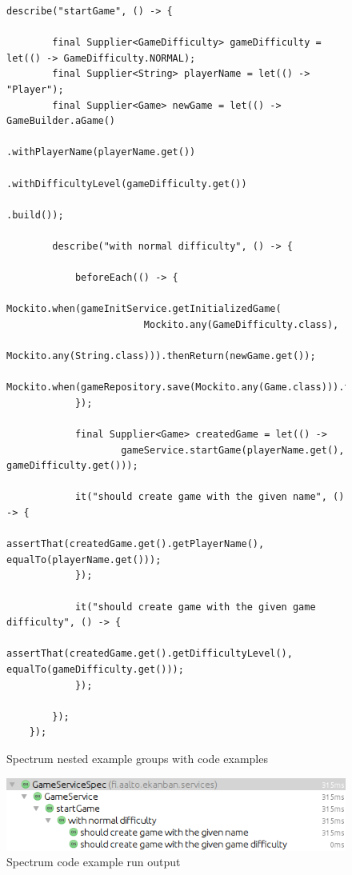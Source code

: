     \begin{figure}[H]
    \begin{lstlisting}[style=java]
    describe("startGame", () -> {

        final Supplier<GameDifficulty> gameDifficulty = let(() -> GameDifficulty.NORMAL);
        final Supplier<String> playerName = let(() -> "Player");
        final Supplier<Game> newGame = let(() -> GameBuilder.aGame()
                                                    .withPlayerName(playerName.get())
                                                    .withDifficultyLevel(gameDifficulty.get())
                                                    .build());

        describe("with normal difficulty", () -> {

            beforeEach(() -> {
                Mockito.when(gameInitService.getInitializedGame(
                        Mockito.any(GameDifficulty.class),
                        Mockito.any(String.class))).thenReturn(newGame.get());
                Mockito.when(gameRepository.save(Mockito.any(Game.class))).thenReturn(newGame.get());
            });

            final Supplier<Game> createdGame = let(() ->
                    gameService.startGame(playerName.get(), gameDifficulty.get()));

            it("should create game with the given name", () -> {
                assertThat(createdGame.get().getPlayerName(), equalTo(playerName.get()));
            });

            it("should create game with the given game difficulty", () -> {
                assertThat(createdGame.get().getDifficultyLevel(), equalTo(gameDifficulty.get()));
            });

        });
    });
    \end{lstlisting}
        \caption{Spectrum nested example groups with code examples}
        \label{fig:spectrum-example}

    \end{figure}

    \begin{figure}[H]
      \begin{center}
        \begin{topbot}[style=mdstyle]
        \includegraphics[width=\textwidth]{images/spectrum-result.png}
        \end{topbot}
        \caption{Spectrum code example run output}
        \label{fig:spectrum-result}
      \end{center}
    \end{figure}


